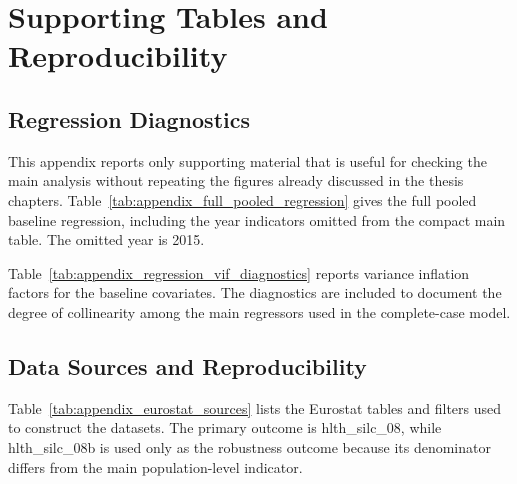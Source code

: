\chapter{Supporting Tables and Reproducibility}
\label{ch:appendix}
\raggedbottom

\section{Regression Diagnostics}

This appendix reports only supporting material that is useful for checking the main analysis without repeating the figures already discussed in the thesis chapters. Table~\ref{tab:appendix_full_pooled_regression} gives the full pooled baseline regression, including the year indicators omitted from the compact main table. The omitted year is 2015.

\begin{table}[H]
\centering
\scriptsize
\caption{Full pooled baseline regression with year indicators}
\label{tab:appendix_full_pooled_regression}

\end{table}

Table~\ref{tab:appendix_regression_vif_diagnostics} reports variance inflation factors for the baseline covariates. The diagnostics are included to document the degree of collinearity among the main regressors used in the complete-case model.

\begin{table}[H]
\centering
\small
\caption{Variance inflation factors for baseline covariates}
\label{tab:appendix_regression_vif_diagnostics}

\end{table}

\section{Data Sources and Reproducibility}

Table~\ref{tab:appendix_eurostat_sources} lists the Eurostat tables and filters used to construct the datasets. The primary outcome is hlth\_silc\_08, while hlth\_silc\_08b is used only as the robustness outcome because its denominator differs from the main population-level indicator.

\begin{table}[H]
\centering
\scriptsize
\caption{Eurostat source tables, filters, and extraction dates}
\label{tab:appendix_eurostat_sources}

\end{table}

